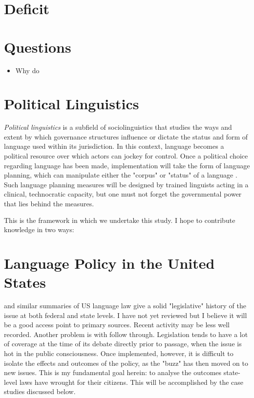\documentclass{article}
\begin{document}
\section*{Deficit}

\section*{Questions}

\begin{itemize}
\item Why do 
\end{itemize}

\section*{Political Linguistics}

\textit{Political linguistics} is a subfield of sociolinguistics that studies the ways
and extent by which governance structures influence or dictate the status and
form of language used within its jurisdiction. In this context, language becomes
a political resource over which actors can jockey for control. Once a political
choice regarding language has been made, implementation will take the form of
language planning, which can manipulate either the "corpus" or "status" of a
language \parencite{Calvet96}. Such language planning measures will be designed
by trained linguists acting in a clinical, technocratic capacity, but one must
not forget the governmental power that lies behind the measures.

This is the framework in which we undertake this study. I hope to
contribute knowledge in two ways:

\section*{Language Policy in the United States}

\cite{Baron92} and similar summaries of US language law give a solid
"legislative" history of the issue at both federal and state levels. I have not
yet reviewed \parencite{Crawford94} but I believe it will be a good access point
to primary sources. Recent activity may be less well recorded. Another problem
is with follow through.  Legislation tends to have a lot of coverage at the time
of its debate directly prior to passage, when the issue is hot in the public
consciousness. Once implemented, however, it is difficult to isolate the effects
and outcomes of the policy, as the "buzz" has then moved on to new issues. This
is my fundamental goal herein: to analyse the outcomes state-level laws have
wrought for their citizens. This will be accomplished by the case studies
discussed below.
\end{document}
